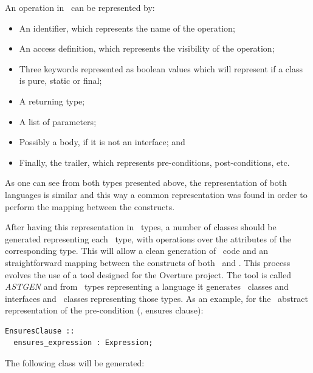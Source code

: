 An operation in \jml\ can be represented by:
\begin{itemize}
\item An identifier, which represents the name of the operation;
\item An access definition, which represents the visibility of the operation;
\item Three keywords represented as boolean values which will represent if a class is pure, static or final;
\item A returning type;
\item A list of parameters;
\item Possibly a body, if it is not an interface; and
\item Finally, the trailer, which represents pre-conditions, post-conditions, etc.
\end{itemize}

As one can see from both types presented above, the representation of both languages is similar and this way a common representation was found in order to perform the mapping between the constructs.

After having this representation in \vdm\ types, a number of classes should be generated representing each \vdm\ type, with operations over the attributes of the corresponding type. This will allow a clean generation of \java\ code and an straightforward mapping between the constructs of both \vpp\ and \jml. This process evolves the use of a tool designed for the Overture project. The tool is called \textit{ASTGEN} and from \vdm\ types representing a language it generates \java\ classes and interfaces and \vpp\ classes representing those types. As an example, for the \jml\ abstract representation of the pre-condition (\ie, ensures clause):

\bigskip

\lstset{style=AST}
\begin{lstlisting}
EnsuresClause ::
  ensures_expression : Expression;
\end{lstlisting}

\bigskip

The following class will be generated:

